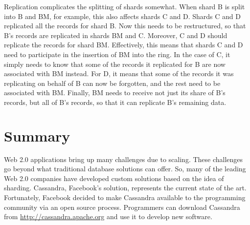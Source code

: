 Replication complicates the splitting of shards somewhat.  
When shard B is split into B and BM, for example, this also affects shards C and D.  
Shards C and D replicated all the records for shard B.  
Now this needs to be restructured, so that B's records are replicated in shards BM and C.  
Moreover, C and D should replicate the records for shard BM.  
Effectively, this means that shards C and D need to participate in the insertion of BM into the ring.  
In the case of C, it simply needs to know that some of the records 
it replicated for B are now associated with BM instead.  
For D, it means that some of the records it was replicating
on behalf of B can now be forgotten, and the rest need to be associated with BM.  
Finally, BM needs to receive not just its share
of B's records, but all of B's records, so that it can replicate B's remaining data.

\section{Summary}

Web 2.0 applications bring up many challenges due to scaling.  
These challenges go beyond what traditional database solutions can offer.  
So, many of the leading Web 2.0 companies have developed custom solutions based on the idea of sharding.  Cassandra, Facebook's solution, represents the current state of the art.  
Fortunately, Facebook decided to make Cassandra available to the
programming community via an open source process.  
Programmers can download Cassandra from \url{http://cassandra.apache.org}
and use it to develop new software.

